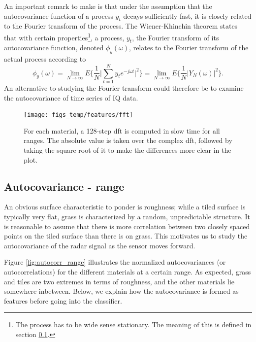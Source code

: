 An important remark to make is that under the assumption that the autocovariance function of a process $y_t$ decays sufficiently fast, it is closely related to the Fourier transform of the process. The Wiener-Khinchin theorem states that \citep{lu_vaswani_2009} with certain properties\footnote{The process has to be wide sense stationary. The meaning of this is defined in section \ref{ACr}.}, a process, $y_t$, the Fourier transform of its autocovariance function, denoted $\phi_y(\omega)$, relates to the Fourier transform of the actual process according to \citep{jakobsson_2015}
\begin{equation}
	\phi_y(\omega) = \lim\limits_{N\rightarrow\infty}E\Bigg\{\frac1N\Big|\sum^N_{t=1}y_te^{-j\omega t}\Big|^2\Bigg\}=\lim\limits_{N\rightarrow\infty}E\Big\{\frac1N|Y_N(\omega)|^2\Big\}.
\end{equation}
An alternative to studying the Fourier transform could therefore be to examine the autocovariance of time series of IQ data.

\begin{figure}[h]
	\centering
	\texttt{[image: figs\_temp/features/fft]}
	\caption{For each material, a 128-step \gls{dft} is computed in slow time for all ranges. The absolute value is taken over the complex \gls{dft}, followed by taking the square root of it to make the differences more clear in the plot. }
	\label{fig:fft}
\end{figure}


\subsection{Autocovariance - range}
\label{ACr}
An obvious surface characteristic to ponder is roughness; while a tiled surface is typically very flat, grass is characterized by a random, unpredictable structure. It is reasonable to assume that there is more correlation between two closely spaced points on the tiled surface than there is on grass. This motivates us to study the autocovariance of the radar signal as the sensor moves forward.

Figure \ref{fig:autocorr_range} illustrates the normalized autocovariances (or autocorrelations) for the different materials at a certain range. As expected, grass and tiles are two extremes in terms of roughness, and the other materials lie somewhere inbetween. Below, we explain how the autocovariance is formed as features before going into the classifier.

